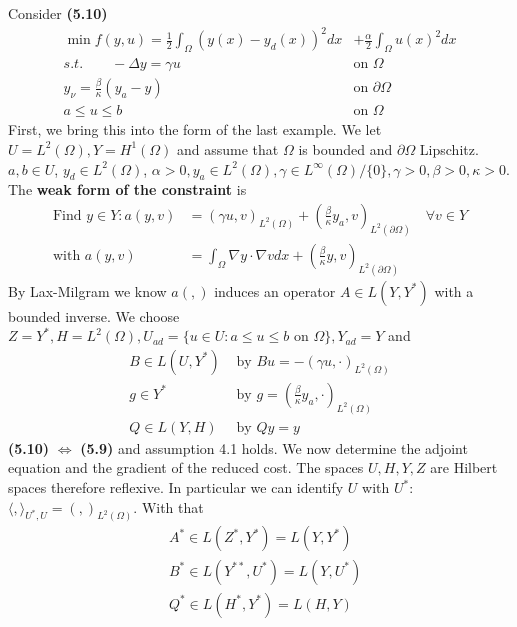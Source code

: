 \begin{example}
	Consider \textbf{(5.10)}
	\begin{align*}
		\min f(y, u) = \frac{1}{2}\int_\Omega (y(x) - y_d(x))^2 dx 
		&+ \frac{\alpha}{2} \int_\Omega u(x)^2 dx \\
		s.t.\qquad - \Delta y = \gamma u \quad &\text{on } \Omega \\
		y_\nu = \frac{\beta}{\kappa}(y_a - y) \quad &\text{on } \partial \Omega\\
		a \le u \le b \quad &\text{on }  \Omega
	\end{align*}
	First, we bring this into the form of the last example. We let $U = L^2(\Omega), Y = H^1(\Omega)$ and assume that $\Omega$ is bounded and $\partial \Omega$ Lipschitz. $a, b \in U$, $y_d \in L^2(\Omega)$, $\alpha > 0, y_a \in L^2(\Omega), \gamma \in L^\infty(\Omega) \slash \{0\}, \gamma > 0, \beta > 0, \kappa > 0$. \\
	The \textbf{weak form of the constraint} is 
	\begin{align*}
		\text{Find } y \in Y: a(y, v) &= (\gamma u,  v)_{L^2(\Omega)} 
		+ (\frac{\beta}{\kappa} y_a, v)_{L^2(\partial \Omega)} \quad \forall v \in Y \\
		\text{with } 
		a(y, v) &= \int_\Omega \nabla y \cdot \nabla v dx + (\frac{\beta}{\kappa}y, v)_{L^2(\partial\Omega)}
	\end{align*}
	By Lax-Milgram we know $a( , )$ induces an operator $A \in L(Y, Y^*)$ with a bounded inverse. We choose $Z = Y^*, H = L^2(\Omega), U_{ad} = \{u \in U: a \le u \le b \text{ on } \Omega\}, Y_{ad} = Y$ and
	\begin{align*}
		B \in L(U, Y^*) &\text{ by } Bu = -(\gamma u, \cdot)_{L^2(\Omega)} \\
		g \in Y^* &\text{ by } g = (\frac{\beta}{\kappa} y_a, \cdot)_{L^2(\Omega)}\\
		Q\in L(Y, H) &\text{ by } Qy = y
	\end{align*}
	\textbf{(5.10)} $\Leftrightarrow$ \textbf{(5.9)} and assumption 4.1 holds. We now determine the adjoint equation and the gradient of the reduced cost. The spaces $U, H, Y, Z$ are Hilbert spaces therefore reflexive. In particular we can identify $U$ with $U^*$: $\langle , \rangle_{U^*, U} = (, )_{L^2(\Omega)}$. With that 
	\begin{align*}
		&A^* \in L(Z^*, Y^*) = L(Y, Y^*)\\
		&B^* \in L(Y^{**}, U^*) = L(Y, U^*)\\
		&Q^* \in L(H^*, Y^*) = L(H, Y)
	\end{align*}

\end{example}
